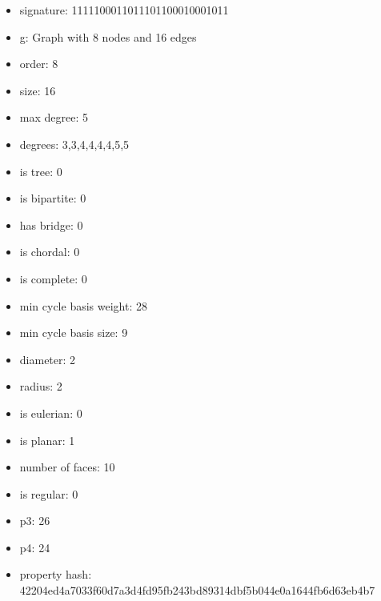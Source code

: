 \begin{itemize}
\item signature: 1111100011011101100010001011
\item g: Graph with 8 nodes and 16 edges
\item order: 8
\item size: 16
\item max degree: 5
\item degrees: 3,3,4,4,4,4,5,5
\item is tree: 0
\item is bipartite: 0
\item has bridge: 0
\item is chordal: 0
\item is complete: 0
\item min cycle basis weight: 28
\item min cycle basis size: 9
\item diameter: 2
\item radius: 2
\item is eulerian: 0
\item is planar: 1
\item number of faces: 10
\item is regular: 0
\item p3: 26
\item p4: 24
\item property hash: 42204ed4a7033f60d7a3d4fd95fb243bd89314dbf5b044e0a1644fb6d63eb4b7
\end{itemize}
\newpage
\begin{figure}
\end{figure}

